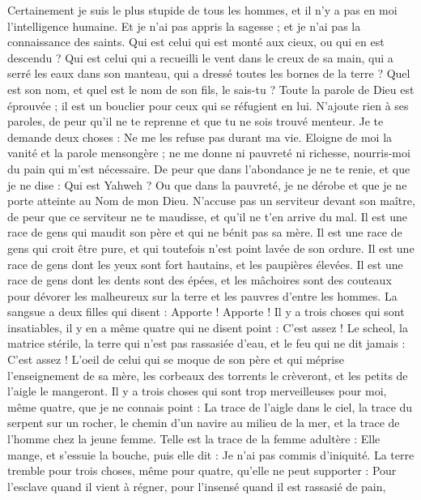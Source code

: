 \begin{multicols}{2}
Certainement je suis le plus stupide de tous les hommes, et il n'y a pas en moi l’intelligence humaine.
Et je n'ai pas appris la sagesse ; et je n’ai pas la connaissance des saints.
Qui est celui qui est monté aux cieux, ou qui en est descendu ? Qui est celui qui a recueilli le vent dans le creux de sa main, qui a serré les eaux dans son manteau, qui a dressé toutes les bornes de la terre ? Quel est son nom, et quel est le nom de son fils, le sais-tu ?
Toute la parole de Dieu est éprouvée ; il est un bouclier pour ceux qui se réfugient en lui.
N'ajoute rien à ses paroles, de peur qu'il ne te reprenne et que tu ne sois trouvé menteur.
Je te demande deux choses : Ne me les refuse pas durant ma vie.
Eloigne de moi la vanité et la parole mensongère ; ne me donne ni pauvreté ni richesse, nourris-moi du pain qui m’est nécessaire.
De peur que dans l’abondance je ne te renie, et que je ne dise : Qui est Yahweh ? Ou que dans la pauvreté, je ne dérobe et que je ne porte atteinte au Nom de mon Dieu.
N’accuse pas un serviteur devant son maître, de peur que ce serviteur ne te maudisse, et qu'il ne t'en arrive du mal.
Il est une race de gens qui maudit son père et qui ne bénit pas sa mère.
Il est une race de gens qui croit être pure, et qui toutefois n'est point lavée de son ordure.
Il est une race de gens dont les yeux sont fort hautains, et les paupières élevées.
Il est une race de gens dont les dents sont des épées, et les mâchoires sont des couteaux pour dévorer les malheureux sur la terre et les pauvres d’entre les hommes.
La sangsue a deux filles qui disent : Apporte ! Apporte ! Il y a trois choses qui sont insatiables, il y en a même quatre qui ne disent point : C'est assez !
Le scheol, la matrice stérile, la terre qui n'est pas rassasiée d'eau, et le feu qui ne dit jamais : C'est assez !
L'oeil de celui qui se moque de son père et qui méprise l'enseignement de sa mère, les corbeaux des torrents le crèveront, et les petits de l'aigle le mangeront.
Il y a trois choses qui sont trop merveilleuses pour moi, même quatre, que je ne connais point :
La trace de l'aigle dans le ciel, la trace du serpent sur un rocher, le chemin d'un navire au milieu de la mer, et la trace de l'homme chez la jeune femme.
Telle est la trace de la femme adultère : Elle mange, et s'essuie la bouche, puis elle dit : Je n'ai pas commis d'iniquité.
La terre tremble pour trois choses, même pour quatre, qu’elle ne peut supporter :
Pour l’esclave quand il vient à régner, pour l'insensé quand il est rassasié de pain,

\end{multicols}
